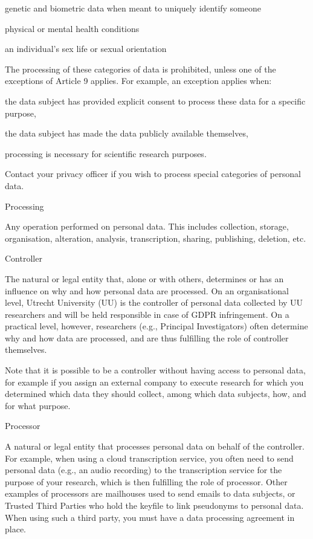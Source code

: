 \documentclass[
]{book}
\begin{document}
genetic and biometric data when meant to uniquely identify someone

physical or mental health conditions

an individual's sex life or sexual orientation

The processing of these categories of data is prohibited, unless one of
the exceptions of Article 9
applies. For example, an exception applies when:

the data subject has provided explicit consent to process these data for
a specific purpose,

the data subject has made the data publicly available themselves,

processing is necessary for scientific research purposes.

Contact your privacy
officer if you wish to process special categories of personal data.

Processing

Any operation performed on personal data. This includes collection, storage,
organisation, alteration, analysis, transcription, sharing, publishing, deletion, etc.

Controller

The natural or legal entity that, alone or with others, determines or has an
influence on why and how personal data are processed. On an
organisational level, Utrecht University (UU) is the controller of personal
data collected by UU researchers and will be held responsible in case of GDPR
infringement. On a practical level, however, researchers (e.g., Principal
Investigators) often determine why and how data are processed, and are thus
fulfilling the role of controller themselves.

Note that it is possible to be a controller without having access to personal
data, for example if you assign an external company to execute research for
which you determined which data they should collect, among which data subjects,
how, and for what purpose.

Processor

A natural or legal entity that processes personal data on behalf of the
controller. For example, when using a cloud transcription service, you often
need to send personal data (e.g., an audio recording) to the transcription
service for the purpose of your research, which is then fulfilling the role
of processor. Other examples of processors are mailhouses used to send emails
to data subjects, or Trusted Third Parties who hold the keyfile to link
pseudonyms to personal data. When using such a third party, you must have a
data processing agreement in place.
\end{document}
